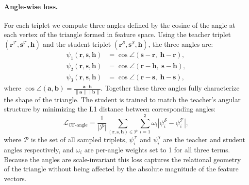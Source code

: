 \paragraph{Angle-wise loss.}
For each triplet we compute three angles defined by the cosine of the angle at each vertex of the triangle formed in feature space. Using the teacher triplet $(\mathbf{r}^{\mathcal{T}}, \mathbf{s}^{\mathcal{T}}, \mathbf{h})$ and the student triplet $(\mathbf{r}^{\mathcal{S}}, \mathbf{s}^{\mathcal{S}}, \mathbf{h})$, the three angles are:
\begin{align}
\psi_1(\mathbf{r}, \mathbf{s}, \mathbf{h}) &= \cos\angle(\mathbf{s} - \mathbf{r},\; \mathbf{h} - \mathbf{r}), \label{eq:angle1} \\
\psi_2(\mathbf{r}, \mathbf{s}, \mathbf{h}) &= \cos\angle(\mathbf{r} - \mathbf{h},\; \mathbf{s} - \mathbf{h}), \label{eq:angle2} \\
\psi_3(\mathbf{r}, \mathbf{s}, \mathbf{h}) &= \cos\angle(\mathbf{r} - \mathbf{s},\; \mathbf{h} - \mathbf{s}), \label{eq:angle3}
\end{align}
where $\cos\angle(\mathbf{a}, \mathbf{b}) = \frac{\mathbf{a} \cdot \mathbf{b}}{\|\mathbf{a}\| \|\mathbf{b}\|}$. Together these three angles fully characterize the shape of the triangle. The student is trained to match the teacher's angular structure by minimizing the L1 distance between corresponding angles:
\begin{equation}
\mathcal{L}_{\text{CF-angle}} = \frac{1}{|\mathcal{P}|} \sum_{(\mathbf{r}, \mathbf{s}, \mathbf{h}) \in \mathcal{P}} \sum_{i=1}^{3} \omega_i \left|\psi_i^{\mathcal{S}} - \psi_i^{\mathcal{T}}\right|,
\label{eq:cf_angle_loss}
\end{equation}
where $\mathcal{P}$ is the set of all sampled triplets, $\psi_i^{\mathcal{T}}$ and $\psi_i^{\mathcal{S}}$ are the teacher and student angles respectively, and $\omega_i$ are per-angle weights set to 1 for all three terms. Because the angles are scale-invariant this loss captures the relational geometry of the triangle without being affected by the absolute magnitude of the feature vectors.

